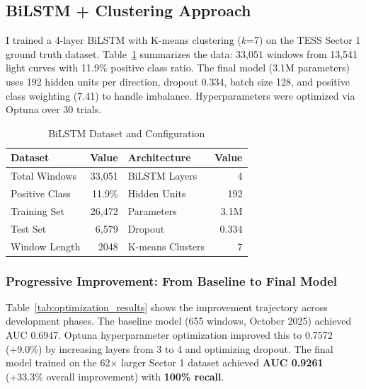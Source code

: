 \documentclass[letterpaper]{article} %
\begin{document}
\subsection{BiLSTM + Clustering Approach}

I trained a 4-layer BiLSTM with K-means clustering ($k$=7) on the TESS Sector 1 ground truth dataset. Table~\ref{tab:bilstm_dataset} summarizes the data: 33,051 windows from 13,541 light curves with 11.9\% positive class ratio. The final model (3.1M parameters) uses 192 hidden units per direction, dropout 0.334, batch size 128, and positive class weighting (7.41) to handle imbalance. Hyperparameters were optimized via Optuna over 30 trials.

\begin{table}[h]
\centering
\caption{BiLSTM Dataset and Configuration}
\label{tab:bilstm_dataset}
\begin{tabular}{@{}lr|lr@{}}
\toprule
\textbf{Dataset} & \textbf{Value} & \textbf{Architecture} & \textbf{Value} \\
\midrule
Total Windows & 33,051 & BiLSTM Layers & 4 \\
Positive Class & 11.9\% & Hidden Units & 192 \\
Training Set & 26,472 & Parameters & 3.1M \\
Test Set & 6,579 & Dropout & 0.334 \\
Window Length & 2048 & K-means Clusters & 7 \\
\bottomrule
\end{tabular}
\end{table}

\subsubsection{Progressive Improvement: From Baseline to Final Model}

Table~\ref{tab:optimization_results} shows the improvement trajectory across development phases. The baseline model (655 windows, October 2025) achieved AUC 0.6947. Optuna hyperparameter optimization improved this to 0.7572 (+9.0\%) by increasing layers from 3 to 4 and optimizing dropout. The final model trained on the 62$\times$ larger Sector 1 dataset achieved \textbf{AUC 0.9261} (+33.3\% overall improvement) with \textbf{100\% recall}.
\end{document}
